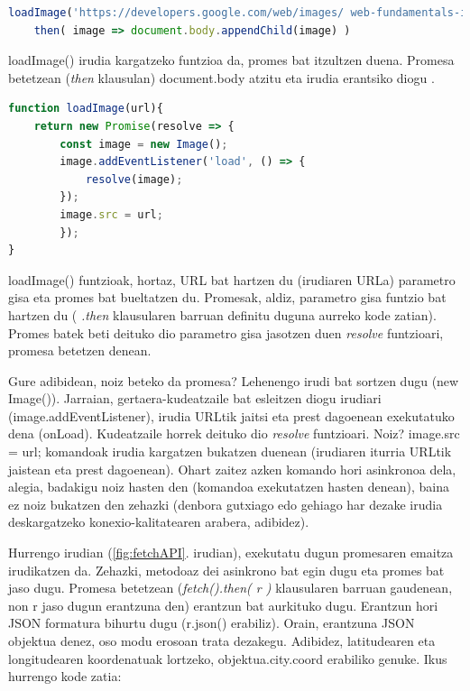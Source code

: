 \begin{lstlisting}[language=JavaScript]
loadImage('https://developers.google.com/web/images/ web-fundamentals-icon192x192.png').
	then( image => document.body.appendChild(image) )
\end{lstlisting}

loadImage() irudia kargatzeko funtzioa da, promes bat itzultzen duena. Promesa betetzean (\textit{then} klausulan) document.body atzitu eta irudia erantsiko diogu .


\begin{lstlisting}[language=JavaScript]
function loadImage(url){
	return new Promise(resolve => {
		const image = new Image();
		image.addEventListener('load', () => {
			resolve(image);
		});
		image.src = url;
		});
}
\end{lstlisting}

loadImage() funtzioak, hortaz, URL bat hartzen du (irudiaren URLa) parametro gisa eta promes bat bueltatzen du. Promesak, aldiz, parametro gisa funtzio bat hartzen du ( \textit{.then} klausularen barruan definitu duguna aurreko kode zatian). Promes batek beti deituko dio parametro gisa jasotzen duen \textit{resolve} funtzioari, promesa betetzen denean.

Gure adibidean, noiz beteko da promesa? Lehenengo irudi bat sortzen dugu (new Image()). Jarraian, gertaera-kudeatzaile bat esleitzen diogu irudiari (image.addEventListener), irudia URLtik jaitsi eta prest dagoenean exekutatuko dena (onLoad). Kudeatzaile horrek deituko dio \textit{resolve} funtzioari. Noiz? image.src = url; komandoak irudia kargatzen bukatzen duenean (irudiaren iturria URLtik jaistean eta prest dagoenean). Ohart zaitez azken komando hori asinkronoa dela, alegia, badakigu noiz hasten den (komandoa exekutatzen hasten denean), baina ez noiz bukatzen den zehazki (denbora gutxiago edo gehiago har dezake irudia deskargatzeko konexio-kalitatearen arabera, adibidez).

Hurrengo irudian (\ref{fig:fetchAPI}. irudian), exekutatu dugun promesaren emaitza irudikatzen da. Zehazki,  metodoaz dei asinkrono bat egin dugu eta promes bat jaso dugu. Promesa betetzean (\textit{fetch().then( r )} klausularen barruan gaudenean, non r jaso dugun erantzuna den)  erantzun bat aurkituko dugu. Erantzun hori JSON formatura bihurtu dugu (r.json() erabiliz). Orain, erantzuna JSON objektua denez, oso modu erosoan trata dezakegu. Adibidez, latitudearen eta longitudearen koordenatuak lortzeko, objektua.city.coord erabiliko genuke. Ikus hurrengo kode zatia:

